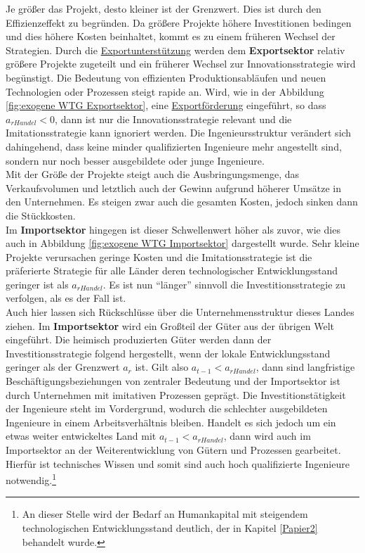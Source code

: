 Je größer das Projekt, desto kleiner ist der Grenzwert. Dies ist durch den Effizienzeffekt zu begründen. Da größere Projekte höhere Investitionen bedingen und dies höhere Kosten beinhaltet, kommt es zu einem früheren Wechsel der Strategien. 
Durch die \uline{Exportunterstützung} werden dem \textbf{Exportsektor} relativ größere Projekte zugeteilt und ein früherer Wechsel zur Innovationsstrategie wird begünstigt. Die Bedeutung von effizienten Produktionsabläufen und neuen Technologien oder Prozessen steigt rapide an. 
Wird, wie in der Abbildung \ref{fig:exogene WTG Exportsektor}, eine \uline{Exportförderung} eingeführt, so dass $a_{rHandel}<0$, dann ist  nur die \textcolor[rgb]{0.74,0.97,0.22}{Innovationsstrategie} relevant und die \textcolor[rgb]{0,0.32,0}{Imitationsstrategie} kann ignoriert werden. Die Ingenieursstruktur verändert sich dahingehend, dass keine minder qualifizierten Ingenieure mehr angestellt sind, sondern nur noch besser ausgebildete oder junge Ingenieure.\\ 
Mit der Größe der Projekte steigt auch die Ausbringungsmenge, das Verkaufsvolumen und letztlich auch der Gewinn aufgrund höherer Umsätze in den Unternehmen. Es steigen zwar auch die gesamten Kosten, jedoch sinken dann die Stückkosten. \\
Im \textbf{Importsektor} hingegen ist dieser Schwellenwert höher als zuvor, wie dies auch in Abbildung \ref{fig:exogene WTG Importsektor} dargestellt wurde. Sehr kleine Projekte verursachen geringe Kosten und die \textcolor[rgb]{0,0.32,0}{Imitationsstrategie} ist die präferierte Strategie für alle Länder deren technologischer Entwicklungsstand geringer ist als $a_{rHandel}$. Es ist nun "`länger"' sinnvoll die \textcolor[rgb]{0,0.32,0}{Investitionsstrategie} zu verfolgen, als es  der Fall ist.\\ %
Auch hier lassen sich Rückschlüsse über die Unternehmensstruktur dieses Landes ziehen.
Im \textbf{Importsektor} wird ein Großteil der Güter aus der übrigen Welt eingeführt. Die heimisch produzierten Güter werden dann der \textcolor[rgb]{0,0.32,0}{Investitionsstrategie} folgend hergestellt, wenn der lokale Entwicklungsstand geringer als der Grenzwert $a_r$ ist. Gilt also $a_{t-1}< a_{rHandel}$, dann sind langfristige Beschäftigungsbeziehungen von zentraler Bedeutung und der Importsektor ist durch Unternehmen mit imitativen Prozessen geprägt. Die Investitionstätigkeit der Ingenieure steht im Vordergrund, wodurch die schlechter ausgebildeten Ingenieure in einem Arbeitsverhältnis bleiben. Handelt es sich jedoch um ein etwas weiter entwickeltes Land mit $a_{t-1}<a_{rHandel}$, dann wird auch im Importsektor an der Weiterentwicklung von Gütern und Prozessen gearbeitet. Hierfür ist technisches Wissen und somit sind auch hoch qualifizierte Ingenieure notwendig.\footnote{An dieser Stelle wird der Bedarf an Humankapital mit steigendem technologischen Entwicklungsstand deutlich, der in Kapitel \ref{Papier2} behandelt wurde.}\\


